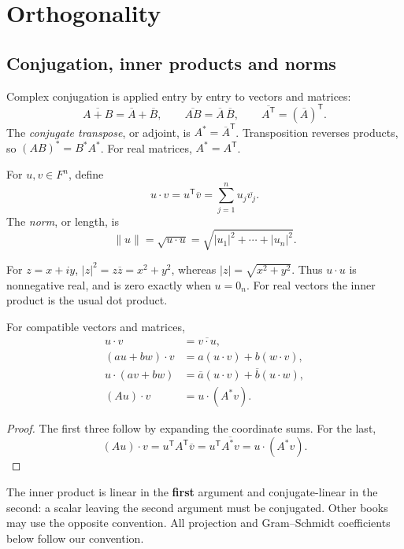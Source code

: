 \chapter{Orthogonality}\label{chap:algebra-orthogonality}

\section{Conjugation, inner products and norms}

Complex conjugation is applied entry by entry to vectors and matrices:
\[
 \overline{A+B}=\overline A+\overline B,\qquad
 \overline{AB}=\overline A\,\overline B,\qquad
 \overline{A^{\mathsf T}}=(\overline A)^{\mathsf T}.
\]
The \emph{conjugate transpose}, or adjoint, is $A^*=\overline A^{\mathsf T}$.
Transposition reverses products, so $(AB)^*=B^*A^*$.
For real matrices, $A^*=A^{\mathsf T}$.

\begin{definition}
For $u,v\in F^n$, define
\[
 \boxed{u\cdot v=u^{\mathsf T}\overline v
       =\sum_{j=1}^n u_j\overline{v_j}.}
\]
The \emph{norm}, or length, is
\[
 \|u\|=\sqrt{u\cdot u}=\sqrt{|u_1|^2+\cdots+|u_n|^2}.
\]
\end{definition}

For $z=x+iy$, $|z|^2=z\overline z=x^2+y^2$, whereas
$|z|=\sqrt{x^2+y^2}$.
Thus $u\cdot u$ is nonnegative real, and is zero exactly when $u=0_n$.
For real vectors the inner product is the usual dot product.

\begin{proposition}
For compatible vectors and matrices,
\begin{align*}
 u\cdot v&=\overline{v\cdot u},\\
 (au+bw)\cdot v&=a(u\cdot v)+b(w\cdot v),\\
 u\cdot(av+bw)&=\overline a(u\cdot v)+\overline b(u\cdot w),\\
 (Au)\cdot v&=u\cdot(A^*v).
\end{align*}
\end{proposition}
\begin{proof}
The first three follow by expanding the coordinate sums. For the last,
\[
 (Au)\cdot v=u^{\mathsf T}A^{\mathsf T}\overline v
 =u^{\mathsf T}\overline{A^*v}=u\cdot(A^*v).
\]
\end{proof}

\begin{remark}
The inner product is linear in the \textbf{first} argument and
conjugate-linear in the second: a scalar leaving the second argument
must be conjugated. Other books may use the opposite convention.
All projection and Gram--Schmidt coefficients below follow our convention.
\end{remark}

